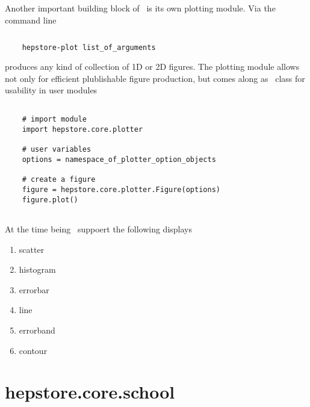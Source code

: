 Another important building block of \hepstore~is its own plotting
module. Via the command line
%
\begin{changemargin}{1.5cm}{1.5cm}
  \centering
  \begin{lstlisting}[language=Bash]
    
    hepstore-plot list_of_arguments
  \end{lstlisting}
\end{changemargin}
%
produces any kind of collection of 1D or 2D figures. The plotting
module allows not only for efficient plublishable figure production,
but comes along as \python~class for usability in user modules
%
\begin{changemargin}{1.5cm}{1.5cm}
  \centering
  \begin{lstlisting}
    
    # import module
    import hepstore.core.plotter

    # user variables
    options = namespace_of_plotter_option_objects

    # create a figure
    figure = hepstore.core.plotter.Figure(options)
    figure.plot()
    
  \end{lstlisting}
\end{changemargin}
%
At the time being \hepstore~suppoert the following displays
%
\begin{enumerate}
\item scatter
\item histogram
\item errorbar
\item line
\item errorband
\item contour
\end{enumerate}
%


\section{hepstore.core.school}

